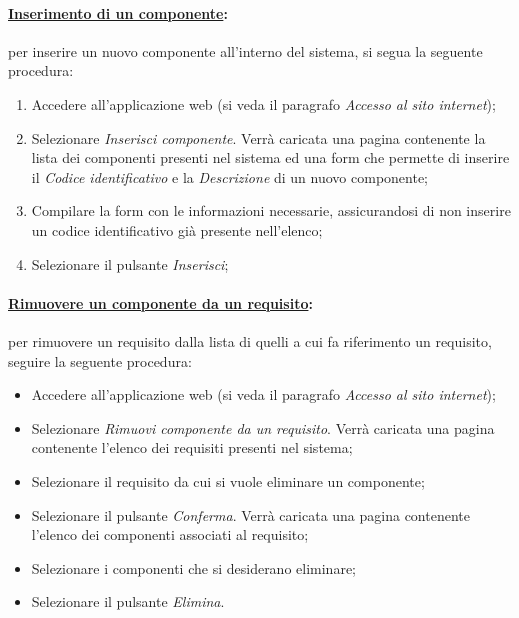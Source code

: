 \paragraph{\underline{Inserimento di un componente}:}
per inserire un nuovo componente all'interno del sistema, si segua la seguente procedura:
\begin{enumerate}
\item Accedere all'applicazione web (si veda il paragrafo \textit{Accesso al sito internet});
\item Selezionare \textit{Inserisci componente}. Verrà caricata una pagina contenente la lista dei componenti presenti nel sistema ed una form che permette di inserire il \textit{Codice identificativo} e la \textit{Descrizione} di un nuovo componente;
\item Compilare la form con le informazioni necessarie, assicurandosi di non inserire un codice identificativo già presente nell'elenco;
\item Selezionare il pulsante \textit{Inserisci};
\end{enumerate}

\paragraph{\underline{Rimuovere un componente da un requisito}:}
per rimuovere un requisito dalla lista di quelli a cui fa riferimento un requisito, seguire la seguente procedura:
\begin{itemize}
\item Accedere all'applicazione web (si veda il paragrafo \textit{Accesso al sito internet});
\item Selezionare \textit{Rimuovi componente da un requisito}. Verrà caricata una pagina contenente l'elenco dei requisiti presenti nel sistema;
\item Selezionare il requisito da cui si vuole eliminare un componente;
\item Selezionare il pulsante \textit{Conferma}. Verrà caricata una pagina contenente l'elenco dei componenti associati al requisito;
\item Selezionare i componenti che si desiderano eliminare;
\item Selezionare il pulsante \textit{Elimina}.
\end{itemize}

